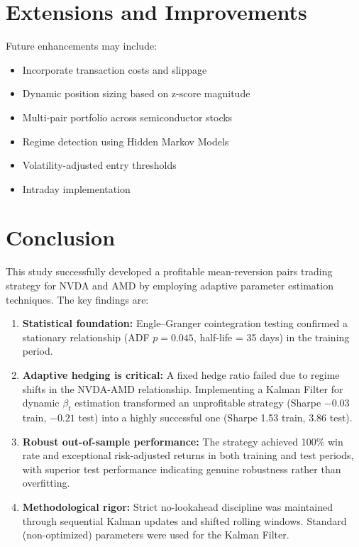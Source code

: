 \documentclass[11pt]{article}
\begin{document}
\section{Extensions and Improvements}

Future enhancements may include:

\begin{itemize}
\item Incorporate transaction costs and slippage
\item Dynamic position sizing based on z-score magnitude
\item Multi-pair portfolio across semiconductor stocks
\item Regime detection using Hidden Markov Models
\item Volatility-adjusted entry thresholds
\item Intraday implementation
\end{itemize}

\section{Conclusion}

This study successfully developed a profitable mean-reversion pairs trading strategy for NVDA and AMD by employing adaptive parameter estimation techniques. The key findings are:

\begin{enumerate}
\item \textbf{Statistical foundation:} Engle–Granger cointegration testing confirmed a stationary relationship (ADF $p = 0.045$, half-life = 35 days) in the training period.

\item \textbf{Adaptive hedging is critical:} A fixed hedge ratio failed due to regime shifts in the NVDA-AMD relationship. Implementing a Kalman Filter for dynamic $\beta_t$ estimation transformed an unprofitable strategy (Sharpe $-0.03$ train, $-0.21$ test) into a highly successful one (Sharpe 1.53 train, 3.86 test).

\item \textbf{Robust out-of-sample performance:} The strategy achieved 100\% win rate and exceptional risk-adjusted returns in both training and test periods, with superior test performance indicating genuine robustness rather than overfitting.

\item \textbf{Methodological rigor:} Strict no-lookahead discipline was maintained through sequential Kalman updates and shifted rolling windows. Standard (non-optimized) parameters were used for the Kalman Filter.
\end{enumerate}
\end{document}

